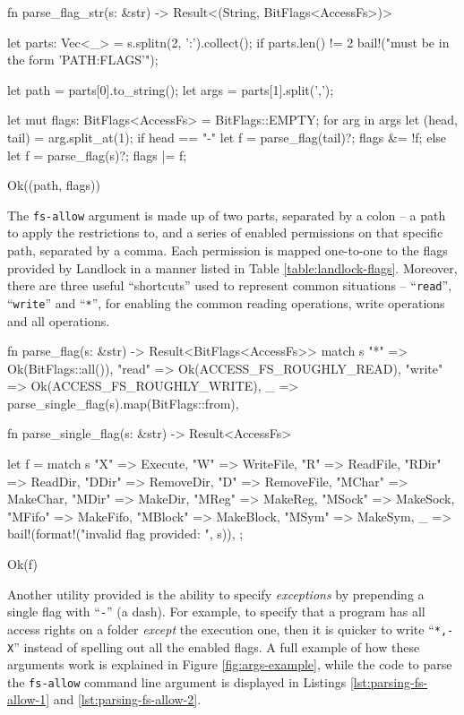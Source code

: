 \begin{code}[language=Rust, caption=Parsing the \texttt{fs-allow} command line option., label=lst:parsing-fs-allow-1]
fn parse_flag_str(s: &str)
    -> Result<(String, BitFlags<AccessFs>)> {
  let parts: Vec<_> = s.splitn(2, ':').collect();
  if parts.len() != 2 {
    bail!("must be in the form 'PATH:FLAGS'");
  }

  let path = parts[0].to_string();
  let args = parts[1].split(',');

  let mut flags: BitFlags<AccessFs> = BitFlags::EMPTY;
  for arg in args {
    let (head, tail) = arg.split_at(1);
    if head == "-" {
      let f = parse_flag(tail)?;
      flags &= !f;
    } else {
      let f = parse_flag(s)?;
      flags |= f;
    }
  }

  Ok((path, flags))
}
\end{code}

The \texttt{fs-allow} argument is made up of two parts, separated by a colon -- a path to apply the restrictions to,
and a series of enabled permissions on that specific path, separated by a comma.
Each permission is mapped one-to-one to the flags provided by Landlock in a manner listed in Table \ref{table:landlock-flags}.
Moreover, there are three useful ``shortcuts'' used to represent common situations -- ``\texttt{read}'', ``\texttt{write}'' and ``\texttt{*}'',
for enabling the common reading operations, write operations and all operations.

\begin{code}[language=Rust, caption=Parsing a single Landlock flag., label=lst:parsing-fs-allow-2]
fn parse_flag(s: &str) -> Result<BitFlags<AccessFs>> {
  match s {
    "*" => Ok(BitFlags::all()),
    "read" => Ok(ACCESS_FS_ROUGHLY_READ),
    "write" => Ok(ACCESS_FS_ROUGHLY_WRITE),
    _ => parse_single_flag(s).map(BitFlags::from),
  }
}

fn parse_single_flag(s: &str) -> Result<AccessFs> {
  let f = match s {
    "X" => Execute,
    "W" => WriteFile,
    "R" => ReadFile,
    "RDir" => ReadDir,
    "DDir" => RemoveDir,
    "D" => RemoveFile,
    "MChar" => MakeChar,
    "MDir" => MakeDir,
    "MReg" => MakeReg,
    "MSock" => MakeSock,
    "MFifo" => MakeFifo,
    "MBlock" => MakeBlock,
    "MSym" => MakeSym,
    _ => bail!(format!("invalid flag provided: {}", s)),
  };

  Ok(f)
}
\end{code}

Another utility provided is the ability to specify \textit{exceptions} by prepending a single flag with ``\texttt{-}'' (a dash).
For example, to specify that a program has all access rights on a folder \textit{except} the execution one, then it is quicker
to write ``\texttt{*,-X}'' instead of spelling out all the enabled flags.
A full example of how these arguments work is explained in Figure \ref{fig:args-example},
while the code to parse the \texttt{fs-allow} command line argument is displayed
in Listings \ref{lst:parsing-fs-allow-1} and \ref{lst:parsing-fs-allow-2}.

